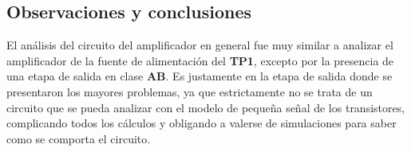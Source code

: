 
\subsection{Observaciones y conclusiones}

El análisis del circuito del amplificador en general fue muy similar a analizar el amplificador de la fuente de alimentación del \textbf{TP1}, excepto por la presencia de una etapa de salida en clase \textbf{AB}. Es justamente en la etapa de salida donde se presentaron los mayores problemas, ya que estrictamente no se trata de un circuito que se pueda analizar con el modelo de pequeña señal de los transistores, complicando todos los cálculos y obligando a valerse de simulaciones para saber como se comporta el circuito.


